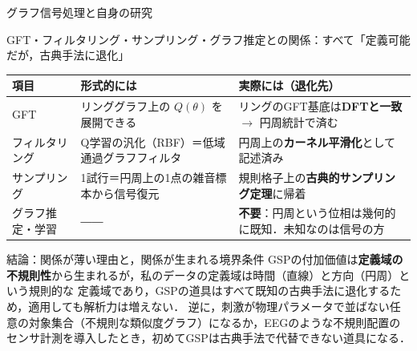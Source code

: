 \documentclass[aspectratio=169,11pt]{beamer}
\begin{document}
\begin{frame}[shrink=10]{グラフ信号処理と自身の研究}
\vspace{0.5mm}
\begin{block}{\footnotesize GFT・フィルタリング・サンプリング・グラフ推定との関係：すべて「定義可能だが，古典手法に退化」}
\centering\tiny
\begin{tabular}{@{}lll@{}}
\toprule
項目 & 形式的には & 実際には（退化先） \\
\midrule
GFT & リンググラフ上の $Q(\theta)$ を展開できる & リングのGFT基底は\textbf{DFTと一致} $\to$ 円周統計で済む \\
フィルタリング & Q学習の汎化（RBF）＝低域通過グラフフィルタ & 円周上の\textbf{カーネル平滑化}として記述済み \\
サンプリング & 1試行＝円周上の1点の雑音標本から信号復元 & 規則格子上の\textbf{古典的サンプリング定理}に帰着 \\
グラフ推定・学習 & ―― & \textbf{不要}：円周という位相は幾何的に既知．未知なのは信号の方 \\
\bottomrule
\end{tabular}
\end{block}

\vspace{0.5mm}
\begin{alertblock}{\footnotesize 結論：関係が薄い理由と，関係が生まれる境界条件}
\tiny
GSPの付加価値は\textbf{定義域の不規則性}から生まれるが，私のデータの定義域は時間（直線）と方向（円周）という規則的な
定義域であり，GSPの道具はすべて既知の古典手法に退化するため，適用しても解析力は増えない．
逆に，刺激が物理パラメータで並ばない任意の対象集合（不規則な類似度グラフ）になるか，EEGのような不規則配置の
センサ計測を導入したとき，初めてGSPは古典手法で代替できない道具になる．
\end{alertblock}
\end{frame}
\end{document}
